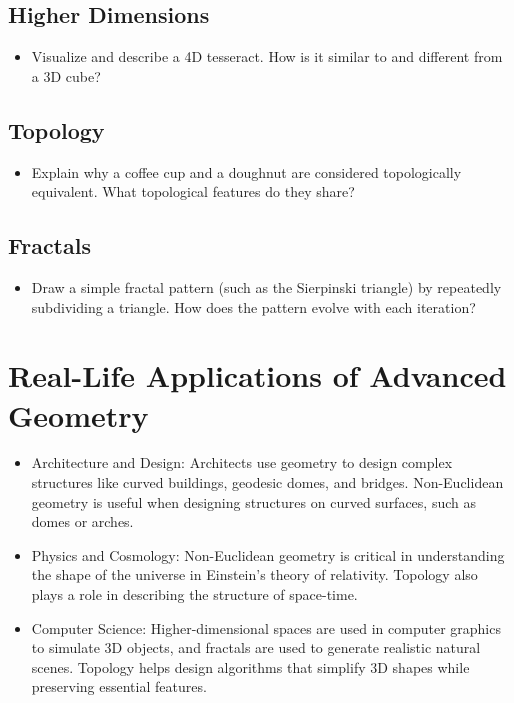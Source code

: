 \subsection{Higher Dimensions}
\begin{itemize}
    \item Visualize and describe a 4D tesseract. How is it similar to and different from a 3D cube?
\end{itemize}

\subsection{Topology}
\begin{itemize}
    \item Explain why a coffee cup and a doughnut are considered topologically equivalent. What topological features do they share?
\end{itemize}

\subsection{Fractals}
\begin{itemize}
    \item Draw a simple fractal pattern (such as the Sierpinski triangle) by repeatedly subdividing a triangle. How does the pattern evolve with each iteration?
\end{itemize}

\section{Real-Life Applications of Advanced Geometry}
\begin{itemize}
    \item Architecture and Design: Architects use geometry to design complex structures like curved buildings, geodesic domes, and bridges. Non-Euclidean geometry is useful when designing structures on curved surfaces, such as domes or arches.
    \item Physics and Cosmology: Non-Euclidean geometry is critical in understanding the shape of the universe in Einstein’s theory of relativity. Topology also plays a role in describing the structure of space-time.
    \item Computer Science: Higher-dimensional spaces are used in computer graphics to simulate 3D objects, and fractals are used to generate realistic natural scenes. Topology helps design algorithms that simplify 3D shapes while preserving essential features.
\end{itemize}

